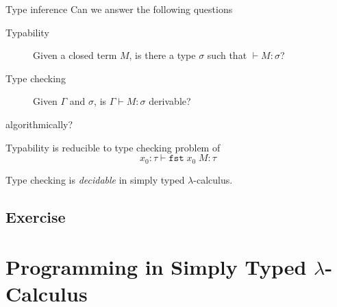 \begin{frame}{Type inference}
  Can we answer the following questions
  \begin{description}
    \item[Typability] Given a closed term $M$, is there a type $\sigma$
      such that $\vdash M : \sigma$? 
    \item[Type checking] Given $\Gamma$ and $\sigma$, is $\Gamma \vdash M : \sigma$ derivable?
  \end{description}
  algorithmically?
  
  Typability is reducible to type checking problem of
  \[
    x_0: \tau \vdash \mathtt{fst} \;x_0\;M : \tau
  \]

  \begin{theorem}
    Type checking is \emph{decidable}
    in simply typed $\lambda$-calculus.
  \end{theorem}
\subsection*{Exercise}
  
\end{frame}

\section{Programming in Simply Typed $\lambda$-Calculus}

